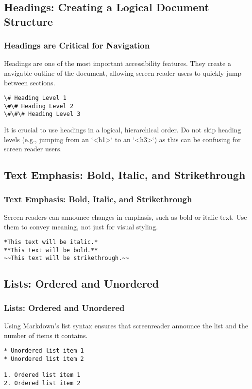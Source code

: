 \subsection{Headings: Creating a Logical Document Structure}
\label{subsec:markdown-headings}
\subsubsection{Headings are Critical for Navigation}
\label{ssubsec:headings-for-navigation}
Headings are one of the most important accessibility features. They create a navigable outline of the document, allowing screen reader users to quickly jump between sections.
\begin{verbatim}
\# Heading Level 1
\#\# Heading Level 2
\#\#\# Heading Level 3
\end{verbatim}
It is crucial to use headings in a logical, hierarchical order. Do not skip heading levels (e.g., jumping from an `<h1>` to an `<h3>`) as this can be confusing for screen reader users.

\subsection{Text Emphasis: Bold, Italic, and Strikethrough}
\label{subsec:markdown-text-emphasis}
\subsubsection{Text Emphasis: Bold, Italic, and Strikethrough}
\label{ssubsec:markdown-emphasis-details}
Screen readers can announce changes in emphasis, such as bold or italic text. Use them to convey meaning, not just for visual styling.
\begin{verbatim}
*This text will be italic.*
**This text will be bold.**
~~This text will be strikethrough.~~
\end{verbatim}

\subsection{Lists: Ordered and Unordered}
\label{subsec:markdown-lists}
\subsubsection{Lists: Ordered and Unordered}
\label{ssubsec:markdown-list-details}
Using Markdown's list syntax ensures that \gls{screenreader} announce the list and the number of items it contains.
\begin{verbatim}
* Unordered list item 1
* Unordered list item 2

1. Ordered list item 1
2. Ordered list item 2
\end{verbatim}

